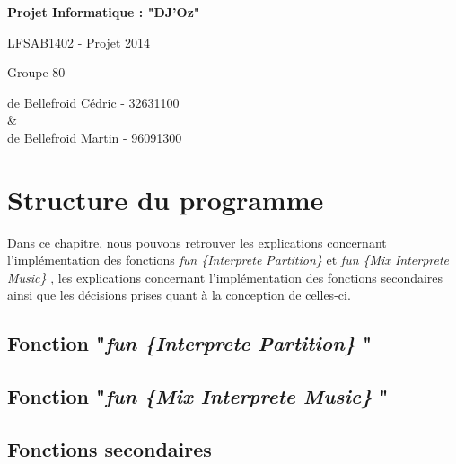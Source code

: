 \documentclass[12pt, a4paper]{report}
\begin{document}
\vspace{5cm}

\begin{center}




\begin{LARGE}
\textbf{Projet Informatique : "DJ'Oz"}
\end{LARGE}
	
\vspace{1cm}

\begin{Large}
\begin{center}

LFSAB1402 - Projet 2014
\vspace{0.5cm}

\end{center}


Groupe 80 

\vspace{0.5cm}
de Bellefroid Cédric - 32631100 \\

\& \\
de Bellefroid Martin - 96091300
\end{Large}

\end{center}
\newpage

\chapter{Structure du programme}
	Dans ce chapitre, nous pouvons retrouver les explications concernant l'implémentation des fonctions \textit{fun \{Interprete Partition\} } et \textit{fun \{Mix Interprete Music\} }, les explications concernant l'implémentation des fonctions secondaires ainsi que les décisions prises quant à la conception de celles-ci.
	
\section{Fonction "\textit{fun \{Interprete Partition\} }"}


\section{Fonction "\textit{fun \{Mix Interprete Music\} }"}


\section{Fonctions secondaires}
\end{document}
